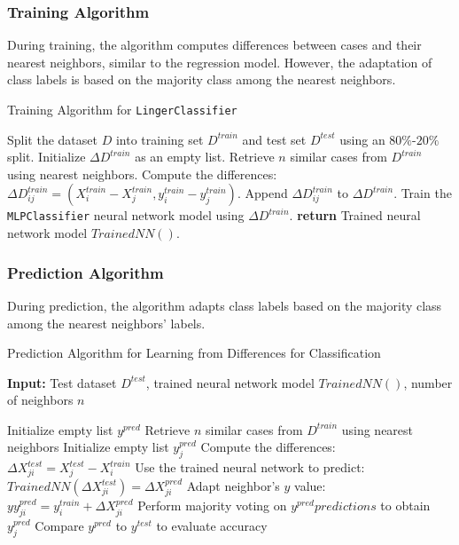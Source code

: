 \documentclass[a4paper, 12pt]{report}
\begin{document}
\subsubsection{Training Algorithm}
During training, the algorithm computes differences between cases and their nearest neighbors, similar to the regression model. 
However, the adaptation of class labels is based on the majority class among the nearest neighbors.

\begin{algorithm}
    \caption{Training Algorithm for \texttt{LingerClassifier}}
    \label{alg:linger_classifier_train}
    \begin{algorithmic}
        \State Split the dataset $D$ into training set $D^{train}$ and test set $D^{test}$ using an $80\%$-$20\%$ split.
        \State Initialize $\Delta D^{train}$ as an empty list.
            \State Retrieve $n$ similar cases from $D^{train}$ using nearest neighbors.
                \State Compute the differences: $\Delta D^{train}_{ij} = (X^{train}_i - X^{train}_j, y^{train}_i - y^{train}_j)$.
                \State Append $\Delta D^{train}_{ij}$ to $\Delta D^{train}$.
            \EndFor
        \EndFor
        \State Train the \texttt{MLPClassifier} neural network model using $\Delta D^{train}$.
        \State \textbf{return} Trained neural network model $Trained NN()$.
    \end{algorithmic}
\end{algorithm}

\subsubsection{Prediction Algorithm}
During prediction, the algorithm adapts class labels based on the majority class among the nearest neighbors' labels.

\begin{algorithm}
	\caption{Prediction Algorithm for Learning from Differences for Classification}
	\label{alg:learning_from_differences_predict_classification}
	\textbf{Input:} Test dataset $D^{test}$, trained neural network model $Trained NN()$, number of neighbors $n$
	\begin{algorithmic}[1]
        \State Initialize empty list $y^{pred}$
			\State Retrieve $n$ similar cases from $D^{train}$ using nearest neighbors
			\State Initialize empty list $y^{pred}_j$
				\State Compute the differences: $\Delta X^{test}_{ji} = X^{test}_j - X^{train}_i$
				\State Use the trained neural network to predict: $Trained NN(\Delta X^{test}_{ji}) = \Delta X^{pred}_{ji}$
				\State Adapt neighbor's $y$ value: $yy^{pred}_{ji} = y^{train}_i + \Delta X^{pred}_{ji}$
			\EndFor
			\State Perform majority voting on $y^{pred}predictions$ to obtain $y^{pred}_j$
		\EndFor
		\State Compare $y^{pred}$ to $y^{test}$ to evaluate accuracy
	\end{algorithmic}
\end{algorithm}
\end{document}
